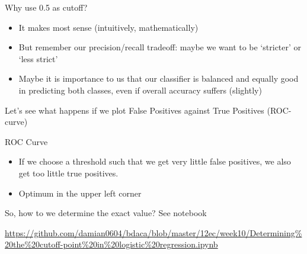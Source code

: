 \documentclass[compress]{beamer}
\begin{document}
\begin{frame}{Why use 0.5 as cutoff?}
\begin{itemize}[<+->]
	\item It makes most sense (intuitively, mathematically)
	\item But remember our precision/recall tradeoff: maybe we want to be `stricter' or `less strict'
	\item Maybe it is importance to us that our classifier is balanced and equally good in predicting both classes, even if overall accuracy suffers (slightly) 
\end{itemize}
\pause
Let's see what happens if we plot False Positives against True Positives (ROC-curve)
\end{frame}


\begin{frame}{ROC Curve}
\begin{itemize}
	\item If we choose a threshold such that we get very little false positives, we also get too little true positives.
	\item Optimum in the upper left corner
\end{itemize}

\end{frame}


\begin{frame}{So, how to we determine the exact value? }
See notebook

\url{https://github.com/damian0604/bdaca/blob/master/12ec/week10/Determining\%20the\%20cutoff-point\%20in\%20logistic\%20regression.ipynb}
\end{frame}
\end{document}
